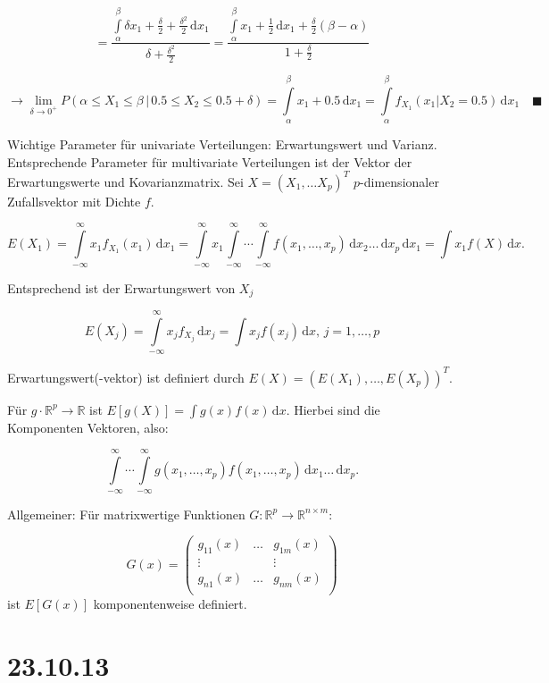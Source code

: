 \documentclass[12pt, a4paper]{article}
\theoremstyle{empty}
\newcommand{\R}{\mathbb{R}}
\newcommand{\1}{\mathds{1}}
\renewcommand{\d}{\,\mathrm{d}}
\begin{document}
\[ = \frac{ \int\limits_\alpha^{\beta} \delta x_1 + \frac{\delta}{2} + \frac{\delta^2}{2} \d x_1} {\delta + \frac{\delta^2}{2}} =  \frac{ \int\limits_\alpha^\beta x_1 + \frac{1}{2} \d x_1 + \frac{\delta}{2}  (\beta - \alpha)} {1 + \frac{\delta}{2}}\]

 \[\rightarrow  \lim_{\delta \to 0^{+}}
  P(\alpha \leq X_1 \leq \beta\, | \, 0.5 \leq X_2 \leq 0.5 + \delta) = \int\limits_{\alpha}^{\beta} x_1 + 0.5 \d x_1 = \int\limits_{\alpha}^\beta f_{X_1}(x_1 | X_2 = 0.5) \d x_1  \quad \blacksquare\]

Wichtige Parameter für univariate Verteilungen: Erwartungswert und Varianz. Entsprechende Parameter für multivariate Verteilungen ist der Vektor der Erwartungswerte und Kovarianzmatrix. Sei $X = (X_1, \ldots X_p)^T$ $p$-dimensionaler Zufallsvektor mit Dichte $f$. 

\[  E(X_1) = \int\limits_{-\infty}^{\infty} x_1 f_{X_1}(x_1) \d x_1  = \int\limits_{-\infty}^{\infty} x_1   \int\limits_{-\infty}^{\infty} \cdots \int\limits_{-\infty}^{\infty} f(x_1, \ldots, x_p) \d x_2 \ldots \d x_p \d x_1 =  \int x_1 f(X) \d x.  \]

Entsprechend ist der Erwartungswert von $X_j$

\[  E(X_j) =  \int\limits_{-\infty}^{\infty} x_j f_{X_j} \d x_j = \int x_j f(x_j) \d x, \, j = 1, \ldots , p \]


Erwartungswert(-vektor) ist definiert durch $E(X) = (E(X_1), \ldots, E(X_p))^T$.


Für $g \cdot \R^p \to \R$ ist $E[g(X)] = \int g(x) f(x) \d x.$ Hierbei sind die Komponenten Vektoren, also:

\[  \int\limits_{-\infty}^{\infty} \cdots \int\limits_{-\infty}^{\infty} g(x_1, \ldots, x_p) f(x_1, \ldots, x_p) \d x_1 \ldots \d x_p . \]

Allgemeiner: Für matrixwertige Funktionen $G: \R^p \to \R^{n\times m}$:

\[   G(x) = \begin{pmatrix}

g_{11}(x)  & \ldots & g_{1m}(x) \\
\vdots & & \vdots \\
g_{n1}(x) & \ldots & g_{nm}(x) \\


\end{pmatrix}  \]
ist $E[G(x)]$ komponentenweise definiert.



\section{23.10.13}
\end{document}
